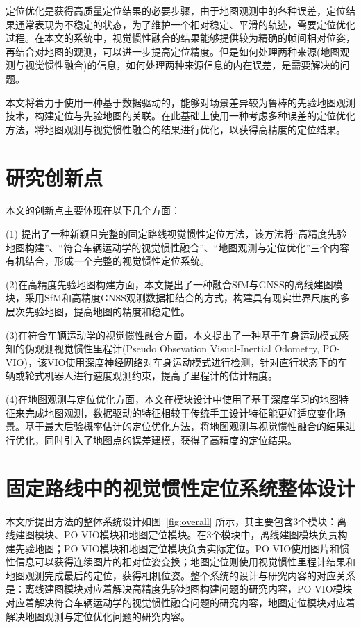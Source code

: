 定位优化是获得高质量定位结果的必要步骤，由于地图观测中的各种误差，定位结果通常表现为不稳定的状态，为了维护一个相对稳定、平滑的轨迹，需要定位优化过程。在本文的系统中，视觉惯性融合的结果能够提供较为精确的帧间相对位姿，再结合对地图的观测，可以进一步提高定位精度。但是如何处理两种来源(地图观测与视觉惯性融合)的信息，如何处理两种来源信息的内在误差，是需要解决的问题。

本文将着力于使用一种基于数据驱动的，能够对场景差异较为鲁棒的先验地图观测技术，构建定位与先验地图的关联。在此基础上使用一种考虑多种误差的定位优化方法，将地图观测与视觉惯性融合的结果进行优化，以获得高精度的定位结果。

\section{研究创新点}
本文的创新点主要体现在以下几个方面：

(1) 提出了一种新颖且完整的固定路线视觉惯性定位方法，该方法将“高精度先验地图构建”、“符合车辆运动学的视觉惯性融合”、“地图观测与定位优化”三个内容有机结合，形成一个完整的视觉惯性定位系统。

(2)在高精度先验地图构建方面，本文提出了一种融合SfM与GNSS的离线建图模块，采用SfM和高精度GNSS观测数据相结合的方式，构建具有现实世界尺度的多层次先验地图，提高地图的精度和稳定性。

(3)在符合车辆运动学的视觉惯性融合方面，本文提出了一种基于车身运动模式感知的伪观测视觉惯性里程计(Pseudo Obsevation Visual-Inertial Odometry, PO-VIO)，该VIO使用深度神经网络对车身运动模式进行检测，针对直行状态下的车辆或轮式机器人进行速度观测约束，提高了里程计的估计精度。

(4)在地图观测与定位优化方面，本文在模块设计中使用了基于深度学习的地图特征来完成地图观测，数据驱动的特征相较于传统手工设计特征能更好适应变化场景。基于最大后验概率估计的定位优化方法，将地图观测与视觉惯性融合的结果进行优化，同时引入了地图点的误差建模，获得了高精度的定位结果。

\section{固定路线中的视觉惯性定位系统整体设计}

本文所提出方法的整体系统设计如图~\ref{fig:overall} 所示，其主要包含3个模块：离线建图模块、PO-VIO模块和地图定位模块。在3个模块中，离线建图模块负责构建先验地图；PO-VIO模块和地图定位模块负责实际定位。PO-VIO使用图片和惯性信息可以获得连续图片的相对位姿变换；地图定位则使用视觉惯性里程计结果和地图观测完成最后的定位，获得相机位姿。整个系统的设计与研究内容的对应关系是：离线建图模块对应着解决高精度先验地图构建问题的研究内容，PO-VIO模块对应着解决符合车辆运动学的视觉惯性融合问题的研究内容，地图定位模块对应着解决地图观测与定位优化问题的研究内容。

